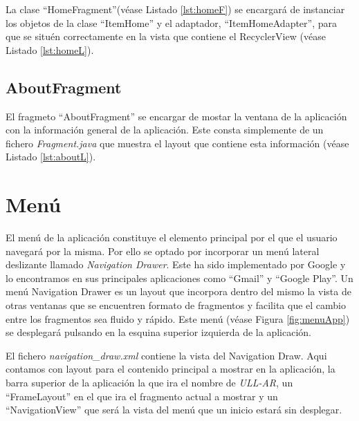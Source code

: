 

La clase ``HomeFragment''(véase Listado \ref{lst:homeF}) se encargará de instanciar los objetos de la clase ``ItemHome'' y el adaptador, ``ItemHomeAdapter'', para que se situén correctamente en la vista que contiene el RecyclerView (véase Listado \ref{lst:homeL}). 
  






\subsection{AboutFragment}

El fragmeto ``AboutFragment'' se encargar de mostar la ventana de la aplicación con la información general de la aplicación. Este consta simplemente de un fichero \textit{Fragment.java} que muestra el layout que contiene esta información (véase Listado \ref{lst:aboutL}).




\section{Menú}

El menú de la aplicación constituye el elemento principal por el que el usuario navegará por la misma. Por ello se optado por incorporar un menú lateral deslizante llamado \textit{Navigation Drawer}. Este ha sido implementado por Google y lo encontramos en sus principales aplicaciones como ``Gmail'' y ``Google Play''. Un menú Navigation Drawer es un layout que incorpora dentro del mismo la vista de otras ventanas que se encuentren formato de fragmentos  y facilita que el cambio entre los fragmentos sea fluido y rápido. Este menú (véase Figura \ref{fig:menuApp}) se desplegará pulsando en la esquina superior izquierda de la aplicación.
   
El fichero \textit{navigation\_draw.xml} contiene la vista del Navigation Draw. Aqui contamos con layout para el contenido principal a mostrar en la aplicación, la barra superior de la aplicación la que ira el nombre de \textit{ULL-AR}, un ``FrameLayout'' en el que ira el fragmento actual a mostrar y un ``NavigationView'' que será la vista del menú que un inicio estará sin desplegar.


